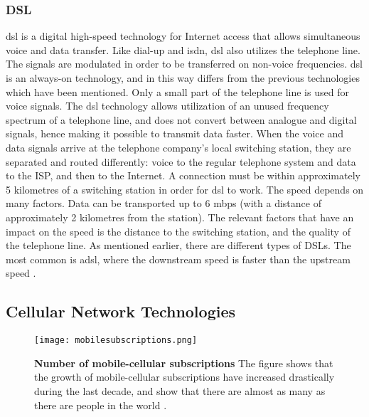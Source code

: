 \subsubsection{DSL}
\gls{dsl} is a digital high-speed technology for Internet access that allows simultaneous voice and data transfer. Like dial-up and \gls{isdn}, \gls{dsl} also utilizes the telephone line. The signals are modulated in order to be transferred on non-voice frequencies. \gls{dsl} is an always-on technology, and in this way differs from the previous technologies which have been mentioned. Only a small part of the telephone line is used for voice signals. The \gls{dsl} technology allows utilization of an unused frequency spectrum of a telephone line, and does not convert between analogue and digital signals, hence making it possible to transmit data faster. When the voice and data signals arrive at the telephone company's local switching station, they are separated and routed differently: voice to the regular telephone system and data to the ISP, and then to the Internet. A connection must be within approximately 5 kilometres of a  switching station in order for \gls{dsl} to work. The speed depends on many factors. Data can be transported up to 6 \gls{mbps} (with a distance of approximately 2 kilometres from the station). The relevant factors that have an impact on the speed is the distance to the switching station, and the quality of the telephone line. As mentioned earlier, there are different types of DSLs. The most common is \gls{adsl}, where the downstream speed is faster than the upstream speed \cite{differentuplinks}.



\subsection{Cellular Network Technologies}

\begin{figure}[t]
  \centering
      \texttt{[image: mobilesubscriptions.png]}
  \caption [Number of mobile-cellular subscriptions]{\textbf{Number of mobile-cellular subscriptions} The figure shows that the growth of mobile-cellular subscriptions have increased drastically during the last decade, and show that there are almost as many as there are people in the world \cite{itu2013}.}
  \label{fig:subscribers}
\end{figure}

